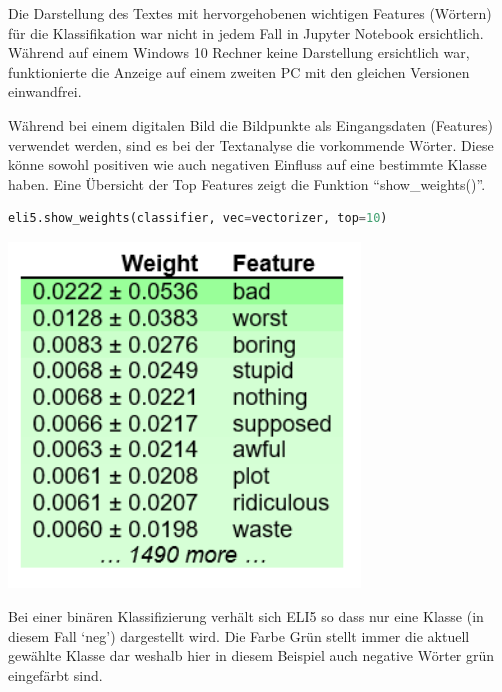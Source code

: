 \documentclass[
  12pt, %
  a4paper, %
  oneside, %
  openany, 
  numbers=noenddot, %
  BCOR=5mm, %
  parskip=half*, %
  thesis, %
]{bfhbook}
\begin{document}
\begin{myboxi}
Die Darstellung des Textes mit hervorgehobenen wichtigen Features (Wörtern) für die Klassifikation war nicht in jedem Fall in Jupyter Notebook ersichtlich. Während auf einem Windows 10 Rechner keine Darstellung ersichtlich war, funktionierte die Anzeige auf einem zweiten PC mit den gleichen Versionen einwandfrei.
\end{myboxi}
 \break
 \break
Während bei einem digitalen Bild die Bildpunkte als Eingangsdaten (Features) verwendet werden, sind es bei der Textanalyse die vorkommende Wörter. Diese könne sowohl positiven wie auch negativen Einfluss auf eine bestimmte Klasse haben. Eine Übersicht der Top Features zeigt die Funktion ``show\_weights()''.
\begin{lstlisting}[language=Python]
eli5.show_weights(classifier, vec=vectorizer, top=10)
\end{lstlisting}
\begin{center}
\begin{minipage}[t]{0.45\linewidth}
\vspace{0pt}
\centering
	\includegraphics[width=0.7\textwidth]{Bilder/MovieReviews-SentimentClassification_Weights.PNG}
\end{minipage}\hfill
\begin{minipage}[t]{0.45\linewidth}
\vspace{20pt}
Bei einer binären Klassifizierung verhält sich ELI5  so dass nur eine Klasse (in diesem Fall `neg') dargestellt wird. Die Farbe Grün stellt immer die aktuell gewählte Klasse dar weshalb hier in diesem Beispiel auch negative Wörter grün eingefärbt sind.
\end{minipage}
\end{center}
\end{document}
